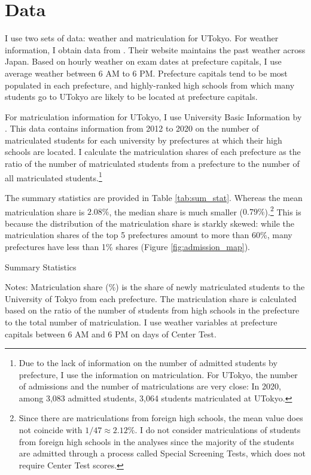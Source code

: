 \documentclass[12pt,letterpaper]{article}
\begin{document}
\section{Data}\label{sec:data}

I use two sets of data: weather and matriculation for UTokyo.
For weather information, I obtain data from .
Their website maintains the past weather across Japan.
Based on hourly weather on exam dates at prefecture capitals, I use average weather between 6 AM to 6 PM.
Prefecture capitals tend to be most populated in each prefecture, and highly-ranked high schools from which many students go to UTokyo are likely to be located at prefecture capitals.

For matriculation information for UTokyo, I use University Basic Information by .
This data contains information from 2012 to 2020 on the number of matriculated students for each university by prefectures at which their high schools are located.
I calculate the matriculation shares of each prefecture as the ratio of the number of matriculated students from a prefecture to the number of all matriculated students.\footnote{
  Due to the lack of information on the number of admitted students by prefecture, I use the information on matriculation.
  For UTokyo, the number of admissions and the number of matriculations are very close:
  In 2020, among 3,083 admitted students, 3,064 students matriculated at UTokyo.
}

The summary statistics are provided in Table \ref{tab:sum_stat}.
Whereas the mean matriculation share is $2.08 \%$, the median share is much smaller ($0.79 \%$).\footnote{
  Since there are matriculations from foreign high schools, the mean value does not coincide with $1 / 47 \approx 2.12\%$.
  I do not consider matriculations of students from foreign high schools in the analyses since the majority of the students are admitted through a process called Special Screening Tests, which does not require Center Test scores.
}
This is because the distribution of the matriculation share is starkly skewed:
while the matriculation shares of the top 5 prefectures amount to more than 60\%, many prefectures have less than 1\% shares (Figure \ref{fig:admission_map}).


\begin{table}[H]
  \centering
  \caption{Summary Statistics}
  \resizebox{0.8\linewidth}{!}{
  
  }
  \label{tab:sum_stat}
  \footnotesize
  \begin{tablenotes}
    \item 
      Notes:
      Matriculation share (\%) is the share of newly matriculated students to the University of Tokyo from each prefecture.
      The matriculation share is calculated based on the ratio of the number of students from high schools in the prefecture to the total number of matriculation.
      I use weather variables at prefecture capitals between 6 AM and 6 PM on days of Center Test.
  \end{tablenotes}
\end{table}
\end{document}

